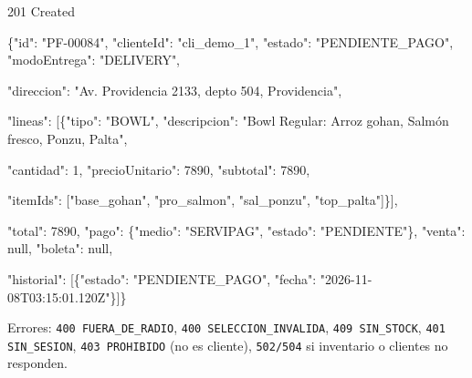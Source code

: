 \begin{codigo}
201 Created\par
\{"id":\allowbreak{} "PF-\allowbreak{}00084",\allowbreak{} "clienteId":\allowbreak{} "cli\_\allowbreak{}demo\_\allowbreak{}1",\allowbreak{} "estado":\allowbreak{} "PENDIENTE\_\allowbreak{}PAGO",\allowbreak{} "modoEntrega":\allowbreak{} "DELIVERY",\allowbreak{}\par
\hspace*{1\ttw}"direccion":\allowbreak{} "Av.\allowbreak{} Providencia 2133,\allowbreak{} depto 504,\allowbreak{} Providencia",\allowbreak{}\par
\hspace*{1\ttw}"lineas":\allowbreak{} [\allowbreak{}\{"tipo":\allowbreak{} "BOWL",\allowbreak{} "descripcion":\allowbreak{} "Bowl Regular:\allowbreak{} Arroz gohan,\allowbreak{} Salmón fresco,\allowbreak{} Ponzu,\allowbreak{} Palta",\allowbreak{}\par
\hspace*{13\ttw}"cantidad":\allowbreak{} 1,\allowbreak{} "precioUnitario":\allowbreak{} 7890,\allowbreak{} "subtotal":\allowbreak{} 7890,\allowbreak{}\par
\hspace*{13\ttw}"itemIds":\allowbreak{} [\allowbreak{}"base\_\allowbreak{}gohan",\allowbreak{} "pro\_\allowbreak{}salmon",\allowbreak{} "sal\_\allowbreak{}ponzu",\allowbreak{} "top\_\allowbreak{}palta"]\}],\allowbreak{}\par
\hspace*{1\ttw}"total":\allowbreak{} 7890,\allowbreak{} "pago":\allowbreak{} \{"medio":\allowbreak{} "SERVIPAG",\allowbreak{} "estado":\allowbreak{} "PENDIENTE"\},\allowbreak{} "venta":\allowbreak{} null,\allowbreak{} "boleta":\allowbreak{} null,\allowbreak{}\par
\hspace*{1\ttw}"historial":\allowbreak{} [\allowbreak{}\{"estado":\allowbreak{} "PENDIENTE\_\allowbreak{}PAGO",\allowbreak{} "fecha":\allowbreak{} "2026-\allowbreak{}11-\allowbreak{}08T03:\allowbreak{}15:\allowbreak{}01.\allowbreak{}120Z"\}]\}\par
\end{codigo}

Errores: \texttt{400 FUERA\_\allowbreak{}DE\_\allowbreak{}RADIO}, \texttt{400 SELECCION\_\allowbreak{}INVALIDA}, \texttt{409 SIN\_\allowbreak{}STOCK}, \texttt{401 SIN\_\allowbreak{}SESION}, \texttt{403 PROHIBIDO} (no es cliente), \texttt{502/\allowbreak{}504} si inventario o clientes no responden.


